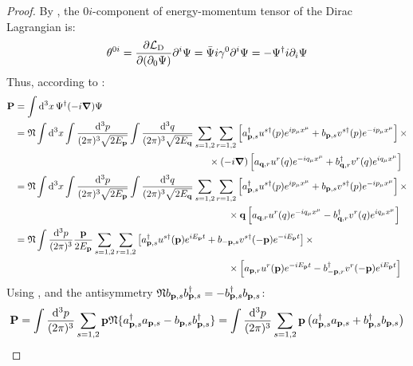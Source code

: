 \begin{proofbox}
  \begin{proof}
    By , the $ 0i $-component of energy-momentum tensor of the Dirac Lagrangian is:
    \begin{equation*}
      \theta^{0i} = \frac{\partial \mathcal{L}_\text{D}}{\partial (\partial_0 \Psi)} \partial^i \Psi = \bar{\Psi} i \gamma^0 \partial^i \Psi = - \Psi^\dagger i \partial_i \Psi
    \end{equation*}
    Thus, according to :
    \begin{equation*}
      \begin{split}
        \mathbf{P}
        &= \int \mathrm{d}^3x\, \Psi^\dagger (-i \boldsymbol{\nabla}) \Psi \\
        &= \mathfrak{N} \int \mathrm{d}^3x \int \frac{\mathrm{d}^3p}{(2\pi)^3 \sqrt{2E_{\mathbf{p}}}} \int \frac{\mathrm{d}^3q}{(2\pi)^3 \sqrt{2E_{\mathbf{q}}}} \sum_{s = 1,2} \sum_{r = 1,2} \left[ a_{\mathbf{p},s}^\dagger u^{s\dagger}(p) e^{i p_\mu x^\mu} + b_{\mathbf{p},s} v^{s\dagger}(p) e^{-ip_\mu x^\mu} \right] \times \\
        & \qquad \qquad \qquad \qquad \qquad \qquad \qquad \qquad \qquad \qquad \times (-i \boldsymbol{\nabla}) \left[ a_{\mathbf{q},r} u^r(q) e^{-i q_\mu x^\mu} + b_{\mathbf{q},r}^\dagger v^r(q) e^{i q_\mu x^\mu} \right] \\
        &= \mathfrak{N} \int \mathrm{d}^3x \int \frac{\mathrm{d}^3p}{(2\pi)^3 \sqrt{2E_{\mathbf{p}}}} \int \frac{\mathrm{d}^3q}{(2\pi)^3 \sqrt{2E_{\mathbf{q}}}} \sum_{s = 1,2} \sum_{r = 1,2} \left[ a_{\mathbf{p},s}^\dagger u^{s\dagger}(p) e^{i p_\mu x^\mu} + b_{\mathbf{p},s} v^{s\dagger}(p) e^{-ip_\mu x^\mu} \right] \times \\
        & \qquad \qquad \qquad \qquad \qquad \qquad \qquad \qquad \qquad \qquad \qquad \times \mathbf{q} \left[ a_{\mathbf{q},r} u^r(q) e^{-i q_\mu x^\mu} - b_{\mathbf{q},r}^\dagger v^r(q) e^{i q_\mu x^\mu} \right] \\
        &= \mathfrak{N} \int \frac{\mathrm{d}^3p}{(2\pi)^3} \frac{\mathbf{p}}{2E_{\mathbf{p}}} \sum_{s = 1,2} \sum_{r = 1,2} \left[ a_{\mathbf{p},s}^\dagger u^{s\dagger}(\mathbf{p}) e^{i E_{\mathbf{p}} t} + b_{-\mathbf{p},s} v^{s\dagger}(-\mathbf{p}) e^{-i E_{\mathbf{p}} t} \right] \times \\
        & \qquad \qquad \qquad \qquad \qquad \qquad \qquad \qquad \qquad \qquad \qquad \times \left[ a_{\mathbf{p},r} u^r(\mathbf{p}) e^{-i E_{\mathbf{p}} t} - b_{-\mathbf{p},r}^\dagger v^r(-\mathbf{p}) e^{i E_{\mathbf{p}} t} \right]
      \end{split}
    \end{equation*}
    Using ,  and the antisymmetry $ \mathfrak{N} b_{\mathbf{p},s} b_{\mathbf{p},s}^\dagger = - b_{\mathbf{p},s}^\dagger b_{\mathbf{p},s} $:
    \begin{equation*}
      \mathbf{P} = \int \frac{\mathrm{d}^3p}{(2\pi)^3} \sum_{s = 1,2} \mathbf{p} \mathfrak{N}\{a_{\mathbf{p},s}^\dagger a_{\mathbf{p},s} - b_{\mathbf{p},s} b_{\mathbf{p},s}^\dagger\} = \int \frac{\mathrm{d}^3p}{(2\pi)^3} \sum_{s = 1,2} \mathbf{p} \left( a_{\mathbf{p},s}^\dagger a_{\mathbf{p},s} + b_{\mathbf{p},s}^\dagger b_{\mathbf{p},s} \right)
    \end{equation*}
  \end{proof}
\end{proofbox}

